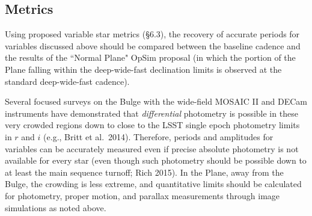 




%
 \subsection{Metrics}
 \label{sec:keyword:metrics}
%

Using proposed variable star metrics (\S 6.3), the recovery of accurate periods for variables discussed above should be compared between the baseline cadence and the
results of the ``Normal Plane" OpSim proposal (in which the portion of the Plane falling within the deep-wide-fast declination limits is observed at the
standard deep-wide-fast cadence).

Several focused surveys on the Bulge with the wide-field MOSAIC II and DECam instruments have demonstrated that \emph{differential} photometry is possible in
these very crowded regions down to close to the LSST single epoch photometry limits in $r$ and $i$ (e.g., Britt et al.~2014). Therefore, periods and
amplitudes for variables can be accurately measured even if precise absolute photometry is not available for every star (even though such photometry should
be possible down to at least the main sequence turnoff; Rich 2015). In the Plane, away from the Bulge, the crowding is less extreme, and quantitative limits
should be calculated for photometry, proper motion, and parallax measurements through image simulations as noted above.

%
%




%
%
%

\navigationbar
